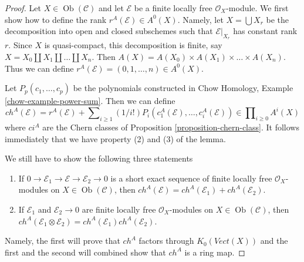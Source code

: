 \documentclass{stacks-project}
\theoremstyle{plain}
\theoremstyle{definition}
\theoremstyle{remark}
\numberwithin{equation}{subsection}
\def\Ob{\mathop{\mathrm{Ob}}\nolimits}
\begin{document}
\begin{proof}
Let $X \in \Ob(\mathcal{C})$ and let $\mathcal{E}$ be a finite
locally free $\mathcal{O}_X$-module. We first show how to define
the rank $r^A(\mathcal{E}) \in A^0(X)$. Namely, let $X = \bigcup X_r$
be the decomposition into open and closed subschemes such that
$\mathcal{E}|_{X_r}$ has constant rank $r$. Since $X$ is quasi-compact, this
decomposition is finite, say $X = X_0 \amalg X_1 \amalg \ldots \amalg X_n$.
Then $A(X) = A(X_0) \times A(X_1) \times \ldots \times A(X_n)$. Thus we
can define $r^A(\mathcal{E}) = (0, 1, \ldots, n) \in A^0(X)$.

\medskip\noindent
Let $P_p(c_1, \ldots, c_p)$ be the polynomials constructed in
Chow Homology, Example \ref{chow-example-power-sum}.
Then we can define
$$
ch^A(\mathcal{E}) = r^A(\mathcal{E}) +
\sum\nolimits_{i \geq 1} (1/i!)
P_i(c^A_1(\mathcal{E}), \ldots, c^A_i(\mathcal{E}))
\in \prod\nolimits_{i \geq 0} A^i(X)
$$
where $ci^A$ are the Chern classes of
Proposition \ref{proposition-chern-class}.
It follows immediately that we have property (2) and (3) of the lemma.

\medskip\noindent
We still have to show the following three statements
\begin{enumerate}
\item If $0 \to \mathcal{E}_1 \to \mathcal{E} \to \mathcal{E}_2 \to 0$
is a short exact sequence of finite locally free $\mathcal{O}_X$-modules
on $X \in \Ob(\mathcal{C})$, then
$ch^A(\mathcal{E}) = ch^A(\mathcal{E}_1) + ch^A(\mathcal{E}_2)$.
\item If $\mathcal{E}_1$ and $\mathcal{E}_2 \to 0$ are finite locally free
$\mathcal{O}_X$-modules on $X \in \Ob(\mathcal{C})$, then
$ch^A(\mathcal{E}_1 \otimes \mathcal{E}_2) =
ch^A(\mathcal{E}_1) ch^A(\mathcal{E}_2)$.
\end{enumerate}
Namely, the first will prove that $ch^A$ factors through
$K_0(\textit{Vect}(X))$ and the first and the second will combined
show that $ch^A$ is a ring map.


\end{proof}
\end{document}
